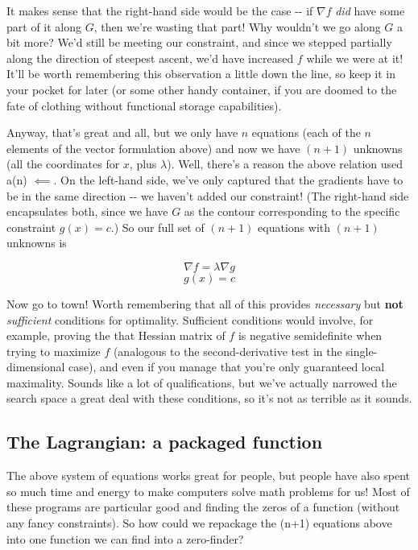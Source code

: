 \documentclass[letterpaper,12pt]{report}
\begin{document}
It makes sense that the right-hand side would be the case -\/- if
\(\nabla f\) \emph{did} have some part of it along \(G\), then we're
wasting that part! Why wouldn't we go along \(G\) a bit more? We'd still
be meeting our constraint, and since we stepped partially along the
direction of steepest ascent, we'd have increased \(f\) while we were at
it! It'll be worth remembering this observation a little down the line,
so keep it in your pocket for later (or some other handy container, if
you are doomed to the fate of clothing without functional storage
capabilities).

Anyway, that's great and all, but we only have \(n\) equations (each of
the \(n\) elements of the vector formulation above) and now we have
\((n+1)\) unknowns (all the coordinates for \(x\), plus \(\lambda\)).
Well, there's a reason the above relation used a(n) \(\impliedby\). On
the left-hand side, we've only captured that the gradients have to be in
the same direction -\/- we haven't added our constraint! (The right-hand
side encapsulates both, since we have \(G\) as the contour corresponding
to the specific constraint \(g(x) = c\).) So our full set of \((n+1)\)
equations with \((n+1)\) unknowns is

\[\nabla f = \lambda \nabla g \] \[g(x) = c\]

Now go to town! Worth remembering that all of this provides
\emph{necessary} but \textbf{not} \emph{sufficient} conditions for
optimality. Sufficient conditions would involve, for example, proving
the that Hessian matrix of \(f\) is negative semidefinite when trying to
maximize \(f\) (analogous to the second-derivative test in the
single-dimensional case), and even if you manage that you're only
guaranteed local maximality. Sounds like a lot of qualifications, but
we've actually narrowed the search space a great deal with these
conditions, so it's not as terrible as it sounds.

\subsection{The Lagrangian: a packaged
function}\label{the-lagrangian-a-packaged-function}

The above system of equations works great for people, but people have
also spent so much time and energy to make computers solve math problems
for us! Most of these programs are particular good and finding the zeros
of a function (without any fancy constraints). So how could we repackage
the (n+1) equations above into one function we can find into a
zero-finder?
\end{document}
